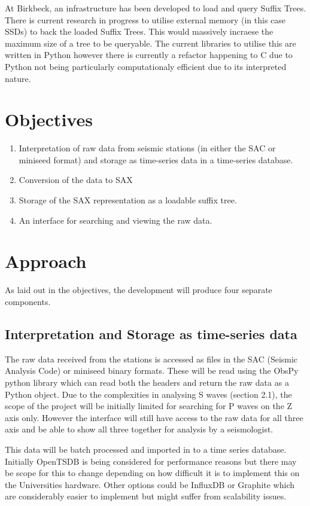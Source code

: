 \documentclass[11pt]{scrartcl}
\begin{document}
	At Birkbeck, an infrastructure has been developed to load and query Suffix Trees.  There is current research in progress to utilise external memory (in this case SSDs) to back the loaded Suffix Trees.  This would massively incraese the maximum size of a tree to be queryable.  The current libraries to utilise this are written in Python however there is currently a refactor happening to C due to Python not being particularly computationaly efficient due to its interpreted nature.

\section{Objectives}
\begin{enumerate}
	\item Interpretation of raw data from seismic stations (in either the SAC or miniseed format) and storage as time-series data in a time-series database.
	\item Conversion of the data to SAX
	\item Storage of the SAX representation as a loadable suffix tree.
	\item An interface for searching and viewing the raw data.
\end{enumerate}

\section{Approach}
	As laid out in the objectives, the development will produce four separate components.
	
\subsection{Interpretation and Storage as time-series data}
	The raw data received from the stations is accessed as files in the SAC (Seismic Analysis Code) or miniseed binary formats.  These will be read using the ObsPy python library which can read both the headers and return the raw data as a Python object.  Due to the complexities in analysing S waves (section 2.1), the scope of the project will be initially limited for searching for P waves on the Z axis only.  However the interface will still have access to the raw data for all three axis and be able to show all three together for analysis by a seismologist.
	
	This data will be batch processed and imported in to a time series database.  Initially OpenTSDB is being considered for performance reasons but there may be scope for this to change depending on how difficult it is to implement this on the Universities hardware.  Other options could be InfluxDB or Graphite which are considerably easier to implement but might suffer from scalability issues.
\end{document}
